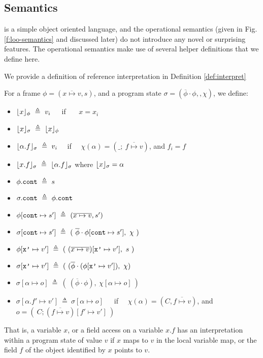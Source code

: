 \subsection{Semantics}
\LangOO is a simple object oriented language, and the operational semantics 
(given in Fig. \ref{f:loo-semantics} and discussed later)
do not introduce any novel or surprising features. The operational 
semantics make use of several helper definitions that we 
define here.

{
We provide a definition of reference interpretation in Definition \ref{def:interpret}
\begin{definition}
\label{def:interpret}
For a frame $\phi= (\overline {x \mapsto v}, s)$, and a program state $\sigma = (\overline \phi \cdot \phi,, \chi)$, we   define:
\begin{itemize}
\item
$\interpret{\phi}{x}\ \triangleq\ v_i$\ \ \ if \ \ \ $x=x_i$
\item
 $\interpret{\sigma}{x}\ \triangleq\  \interpret{\phi}{x}$
\item
$\interpret{\sigma}{\alpha.f}\ \triangleq\ v_i $ \ \ if \ \ $\chi(\alpha)=(\_; \  \overline {f \mapsto v})$, and $f_i=f$
\item
$\interpret{\sigma}{x.f}\ \triangleq\ \interpret{\sigma}{\alpha.f}$ where $\lfloor x \rfloor_{\sigma}=\alpha$
\item
$\phi.\prg{cont} \ \triangleq\ s$ 
\item
$\sigma.\prg{cont} \ \triangleq\ \phi.\prg{cont}$\
\item
$\phi[\prg{cont}\mapsto s'] \ \triangleq\ (\overline {x \mapsto v}, s')$
\item
$\sigma[\prg{cont}\mapsto s'] \ \triangleq \ (\ {\overline \phi}\cdot \phi[\prg{cont}\mapsto s'],\  \chi\ )$ 
\item
$\phi[\prg{x'}\mapsto v'] \ \triangleq\ ( \ (\overline {x \mapsto v})[\prg{x'}\mapsto v'],\ s \ )$
\item
$\sigma[\prg{x'}\mapsto v'] \ \triangleq\ (\ (\overline {\phi} \cdot (\phi[\prg{x'}\mapsto v']), \ \chi)$ 
\item
$\sigma [\alpha \mapsto o ] \ \triangleq\ (\ (\overline {\phi} \cdot \phi), \ \chi [\alpha \mapsto o ]\ )$ 
\item
$\sigma [\alpha.f' \mapsto v' ] \ \triangleq\ \sigma [\alpha \mapsto o ] $\ \ \  if \ \  
$\chi(\alpha)=(C, {\overline {f \mapsto v}})$, and $o=(\ C;  ({\overline {f \mapsto v}})[f' \mapsto v' ]\ )$ 
\end{itemize}
\end{definition}
}
That is, a variable $x$, or a field access on a variable $x.f$ 
has an interpretation within a program state of value $v$
if $x$ maps to $v$ in the local variable map, or the field
$f$ of the object identified by $x$ points to $v$.

